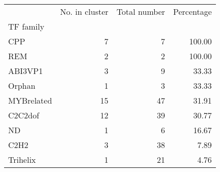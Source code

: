 \begin{tabular}{lrrr}
\toprule
{} &  No. in cluster &  Total number &  Percentage \\
TF family  &                 &               &             \\
\midrule
CPP        &               7 &             7 &      100.00 \\
REM        &               2 &             2 &      100.00 \\
ABI3VP1    &               3 &             9 &       33.33 \\
Orphan     &               1 &             3 &       33.33 \\
MYBrelated &              15 &            47 &       31.91 \\
C2C2dof    &              12 &            39 &       30.77 \\
ND         &               1 &             6 &       16.67 \\
C2H2       &               3 &            38 &        7.89 \\
Trihelix   &               1 &            21 &        4.76 \\
\bottomrule
\end{tabular}
